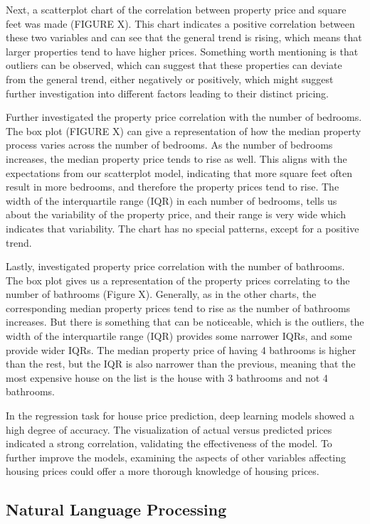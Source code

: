 \documentclass{article}
\begin{document}
\begin{multicols}{2}
Next, a scatterplot chart of the correlation between property price and square feet was made (FIGURE X). This chart indicates a positive correlation between these two variables and can see that the general trend is rising, which means that larger properties tend to have higher prices. Something worth mentioning is that outliers can be observed, which can suggest that these properties can deviate from the general trend, either negatively or positively, which might suggest further investigation into different factors leading to their distinct pricing.

Further investigated the property price correlation with the number of bedrooms. The box plot (FIGURE X) can give a representation of how the median property process varies across the number of bedrooms. As the number of bedrooms increases, the median property price tends to rise as well. This aligns with the expectations from our scatterplot model, indicating that more square feet often result in more bedrooms, and therefore the property prices tend to rise. The width of the interquartile range (IQR) in each number of bedrooms, tells us about the variability of the property price, and their range is very wide which indicates that variability. The chart has no special patterns, except for a positive trend.

Lastly, investigated property price correlation with the number of bathrooms. The box plot gives us a representation of the property prices correlating to the number of bathrooms (Figure X). Generally, as in the other charts, the corresponding median property prices tend to rise as the number of bathrooms increases. But there is something that can be noticeable, which is the outliers, the width of the interquartile range (IQR) provides some narrower IQRs, and some provide wider IQRs. The median property price of having 4 bathrooms is higher than the rest, but the IQR is also narrower than the previous, meaning that the most expensive house on the list is the house with 3 bathrooms and not 4 bathrooms. 

In the regression task for house price prediction, deep learning models showed a high degree of accuracy. The visualization of actual versus predicted prices indicated a strong correlation, validating the effectiveness of the model. To further improve the models, examining the aspects of other variables affecting housing prices could offer a more thorough knowledge of housing prices. 



\subsection{Natural Language Processing}


\end{multicols}
\end{document}
